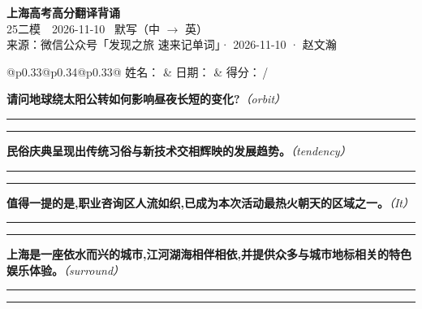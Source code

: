 \documentclass[11pt,a4paper]{article}
\newcommand{\num}[1]{\makebox[1.9em][r]{#1.}\hspace{0.3em}}
\newcommand{\wline}{\noindent\rule{\linewidth}{0.4pt}}
\newcommand{\prompt}[1]{\emph{\textcolor{tipblue}{\small（#1）}}}
\begin{document}
\pagestyle{plain}
\begin{center}
{\LARGE\bfseries 上海高考高分翻译背诵 }\\[0.25em]
{\large 25二模　2026-11-10 \quad\ 默写（中 $\to$ 英）}\\[0.35em]
{\footnotesize 来源：微信公众号「发现之旅 速来记单词」· 2026-11-10 · 赵文瀚}
\end{center}

\vspace{0.4em}
\noindent\begin{tabular}{@{}p{0.33\textwidth}@{}p{0.34\textwidth}@{}p{0.33\textwidth}@{}}
姓名：\underline{\hspace{2.0cm}} & 日期：\underline{\hspace{2.0cm}} & 得分：\underline{\hspace{1.4cm}}\,/ \\
\end{tabular}

\vspace{0.5em}

\vspace{0.8em}
\num{1}\textbf{请问地球绕太阳公转如何影响昼夜长短的变化?}\prompt{orbit}

\vspace{0.3em}

\wline\vspace{0.3em}
\wline

\num{2}\textbf{民俗庆典呈现出传统习俗与新技术交相辉映的发展趋势。}\prompt{tendency}

\vspace{0.3em}

\wline\vspace{0.3em}
\wline

\num{3}\textbf{值得一提的是,职业咨询区人流如织,已成为本次活动最热火朝天的区域之一。}\prompt{It}

\vspace{0.3em}

\wline\vspace{0.3em}
\wline

\num{4}\textbf{上海是一座依水而兴的城市,江河湖海相伴相依,并提供众多与城市地标相关的特色娱乐体验。}\prompt{surround}

\vspace{0.3em}

\wline\vspace{0.3em}
\wline
\end{document}
